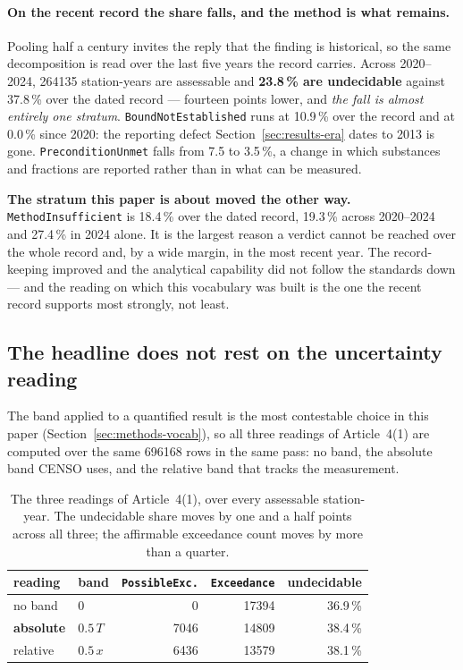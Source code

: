 \paragraph{On the recent record the share falls, and the method is what
remains.} Pooling half a century invites the reply that the finding is
historical, so the same decomposition is read over the last five years the
record carries. Across
\num{2020}--\num{2024}, \num{264135} station-years are assessable and
\textbf{\num{23.8}\,\% are undecidable} against \num{37.8}\,\% over the
dated record --- fourteen points lower, and \emph{the fall is almost entirely
one stratum}. \texttt{BoundNotEstablished} runs at \num{10.9}\,\% over the
record and at \num{0.0}\,\% since \num{2020}: the reporting defect
Section~\ref{sec:results-era} dates to \num{2013} is gone.
\texttt{PreconditionUnmet} falls from \num{7.5} to \num{3.5}\,\%, a change in
which substances and fractions are reported rather than in what can be
measured.

\textbf{The stratum this paper is about moved the other way.}
\texttt{MethodInsufficient} is \num{18.4}\,\% over the dated record,
\num{19.3}\,\% across \num{2020}--\num{2024} and \num{27.4}\,\% in
\num{2024} alone. It is the largest reason a verdict cannot be reached over the
whole record and, by a wide margin, in the most recent year. The record-keeping
improved and the analytical capability did not follow the standards down ---
and the reading on which this vocabulary was built is the one the recent record
supports most strongly, not least.

\subsection{The headline does not rest on the uncertainty reading}
\label{sec:results-uncertainty}
The band applied to a quantified result is the most contestable choice in this
paper (Section~\ref{sec:methods-vocab}), so all three readings of
Article~4(1) are computed over the same
\num{696168} rows in the same pass: no
band, the absolute band CENSO uses, and the relative band that tracks the
measurement.

\begin{table}[htbp]\centering
\caption{The three readings of Article~4(1), over every assessable
station-year. The undecidable share moves by one and a half points across all
three; the affirmable exceedance count moves by more than a quarter.}
\label{tab:uncertainty}
\begin{tabular}{llrrr}
\toprule
reading & band & \texttt{PossibleExc.} & \texttt{Exceedance} & undecidable \\
\midrule
no band & $0$ & \num{0} & \num{17394} & \num{36.9}\,\% \\
\textbf{absolute} & $0.5\,T$ & \num{7046} & \num{14809} & \num{38.4}\,\% \\
relative & $0.5\,x$ & \num{6436} & \num{13579} & \num{38.1}\,\% \\
\bottomrule
\end{tabular}
\end{table}

